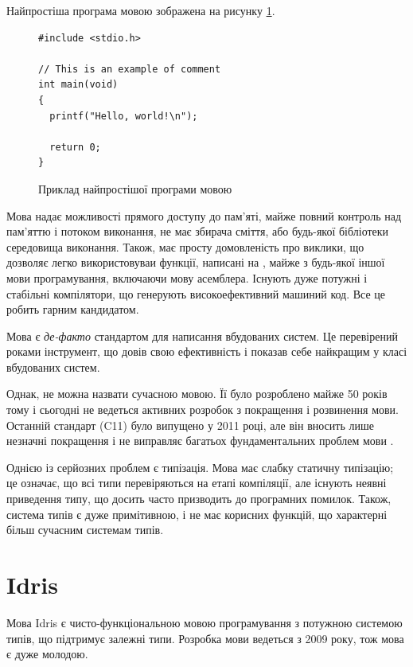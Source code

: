 \documentclass[oneside,14pt,a4paper,final]{myextreport}
\begin{document}
Найпростіша програма мовою \LangC{} зображена на рисунку \ref{example:c}.

\begin{figure}[h]
  \centering
  \begin{BVerbatim}
#include <stdio.h>

// This is an example of comment
int main(void)
{
  printf("Hello, world!\n");

  return 0;
}
  \end{BVerbatim}
  \caption{Приклад найпростішої програми мовою \LangC{}}\label{example:c}
\end{figure}

Мова \LangC{} надає можливості прямого доступу до пам'яті, майже повний контроль над пам'яттю і потоком виконання, не має збирача сміття, або будь-якої бібліотеки середовища виконання. Також, \LangC{} має просту домовленість про виклики, що дозволяє легко використовуваи функції, написані на \LangC{}, майже з будь-якої іншої мови програмування, включаючи мову асемблера. Існують дуже потужні і стабільні компілятори, що генерують високоефективний машиний код. Все це робить \LangC{} гарним кандидатом.

Мова \LangC{} є \emph{де-факто} стандартом для написання вбудованих систем. Це перевірений роками інструмент, що довів свою ефективність і показав себе найкращим у класі вбудованих систем.

Однак, \LangC{} не можна назвати сучасною мовою. Її було розроблено майже 50 років тому і сьогодні не ведеться активних розробок з покращення і розвинення мови. Останній стандарт (C11) було випущено у 2011 році, але він вносить лише незначні покращення і не виправляє багатьох фундаментальних проблем мови \LangC{}.

Однією із серйозних проблем \LangC{} є типізація. Мова \LangC{} має слабку статичну типізацію; це означає, що всі типи перевіряються на етапі компіляції, але існують неявні приведення типу, що досить часто призводить до програмних помилок. Також, система типів є дуже примітивною, і не має корисних функцій, що характерні більш сучасним системам типів.

\section{Idris}

Мова Idris\cite{idris} є чисто-функціональною мовою програмування з потужною системою типів, що підтримує залежні типи. Розробка мови ведеться з 2009 року\cite{idris:first-release}, тож мова є дуже молодою.
\end{document}
